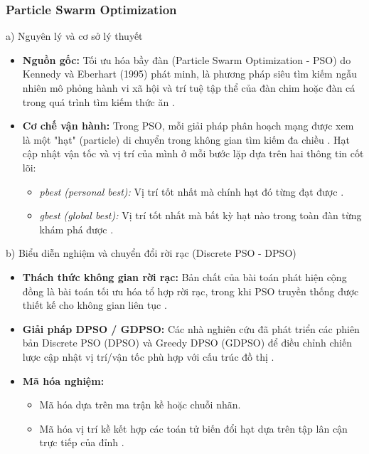 \documentclass[14pt,a4paper]{extarticle}
\begin{document}
\subsubsection{Particle Swarm Optimization}

\noindent a) Nguyên lý và cơ sở lý thuyết
\begin{itemize}
    \item \textbf{Nguồn gốc:} Tối ưu hóa bầy đàn (Particle Swarm Optimization - PSO) do Kennedy và Eberhart (1995) phát minh, là phương pháp siêu tìm kiếm ngẫu nhiên mô phỏng hành vi xã hội và trí tuệ tập thể của đàn chim hoặc đàn cá trong quá trình tìm kiếm thức ăn \cite{Baraa2021}.
    \item \textbf{Cơ chế vận hành:} Trong PSO, mỗi giải pháp phân hoạch mạng được xem là một "hạt" (particle) di chuyển trong không gian tìm kiếm đa chiều \cite{Baraa2021, Beldi2025}. Hạt cập nhật vận tốc và vị trí của mình ở mỗi bước lặp dựa trên hai thông tin cốt lõi:
    \begin{itemize}
        \item \textit{pbest (personal best):} Vị trí tốt nhất mà chính hạt đó từng đạt được \cite{Beldi2025}.
        \item \textit{gbest (global best):} Vị trí tốt nhất mà bất kỳ hạt nào trong toàn đàn từng khám phá được \cite{Beldi2025}.
    \end{itemize}
\end{itemize}

\noindent b) Biểu diễn nghiệm và chuyển đổi rời rạc (Discrete PSO - DPSO)
\begin{itemize}
    \item \textbf{Thách thức không gian rời rạc:} Bản chất của bài toán phát hiện cộng đồng là bài toán tối ưu hóa tổ hợp rời rạc, trong khi PSO truyền thống được thiết kế cho không gian liên tục \cite{Baraa2021, Beldi2025}.
    \item \textbf{Giải pháp DPSO / GDPSO:} Các nhà nghiên cứu đã phát triển các phiên bản Discrete PSO (DPSO) và Greedy DPSO (GDPSO) để điều chỉnh chiến lược cập nhật vị trí/vận tốc phù hợp với cấu trúc đồ thị \cite{Beldi2025}.
    \item \textbf{Mã hóa nghiệm:}
    \begin{itemize}
        \item Mã hóa dựa trên ma trận kề hoặc chuỗi nhãn.
        \item Mã hóa vị trí kề kết hợp các toán tử biến đổi hạt dựa trên tập lân cận trực tiếp của đỉnh \cite{Baraa2021, Beldi2025}.
    \end{itemize}
\end{itemize}
\end{document}
